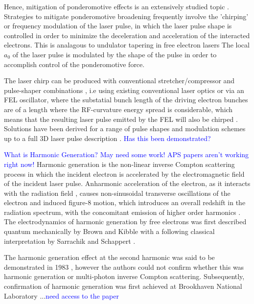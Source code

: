 \documentclass[../main.tex]{subfiles}
\begin{document}
Hence, mitigation of ponderomotive effects is an extensively studied topic \cite{ghebregziabher2013spectral,terzic2014narrow,seipt2015narrowband,rykovanov2016controlling,terzic2016combining,terzic2019improving}. Strategies to mitigate ponderomotive broadening frequently involve the 'chirping' or frequency modulation of the laser pulse, in which the laser pulse shape is controlled in order to minimize the deceleration and acceleration of the interacted electrons. This is analagous to undulator tapering in free electron lasers The local $a_{0}$ of the laser pulse is modulated by the shape of the pulse in order to accomplish control of the ponderomotive force. 

The laser chirp can be produced with conventional stretcher/compressor and pulse-shaper combinations \cite{ghebregziabher2013spectral}, i.e using existing conventional laser optics or via an FEL oscillator, where the substatial bunch length of the driving electron bunches are of a length where the RF-curvature energy spread is considerable, which means that the resulting laser pulse emitted by the FEL will
also be chirped \cite{terzic2014narrow}. Solutions have been derived for a range of pulse shapes and modulation schemes up to a full 3D laser pulse description \cite{terzic2019improving}. \textcolor{blue}{Has this been demonstrated?}


\textcolor{blue}{What is Harmonic Generation? May need some work! APS papers aren't working right now!}
Harmonic generation is the non-linear inverse Compton scattering process in which the incident electron is accelerated by the electromagnetic field of the incident laser pulse. Anharmonic acceleration of the electron, as it interacts with the radiation field \cite{englert1983second}, causes non-sinusoidal transverse oscillations of the electron and induced figure-8 motion, which introduces an overall redshift in the radiation
spectrum, with the concomitant emission of higher order harmonics \cite{sakai2015observation}. The electrodynamics of harmonic generation by free electrons was first described quantum mechanically by Brown and Kibble \cite{brown1964interaction,kibble1965frequency} with a following classical interpretation by Sarrachik and Schappert \cite{sarachik1970classical}. 

The harmonic generation effect at the second harmonic was said to be demonstrated in 1983 \cite{englert1983second}, however the authors could not confirm whether this was harmonic generation or multi-photon inverse Compton scattering. Subsequently, confirmation of harmonic generation was first achieved at Brookhaven National Laboratory \cite{babzien2006observation,kumita2006observation}...\textcolor{blue}{need access to the paper} 
\end{document}
